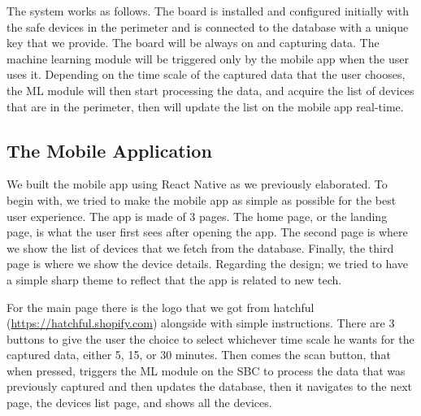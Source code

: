 \documentclass{article}
\begin{document}
The system works as follows. The board is installed and configured initially with the safe devices in the perimeter and is connected to the database with a unique key that we provide. The board will be always on and capturing data. The machine learning module will be triggered only by the mobile app when the user uses it. Depending on the time scale of the captured data that the user chooses, the ML module will then start processing the data, and acquire the list of devices that are in the perimeter, then will update the list on the mobile app real-time.\newline

\subsection{The Mobile Application}
We built the mobile app using React Native as we previously elaborated. To begin with, we tried to make the mobile app as simple as possible for the best user experience. The app is made of 3 pages. The home page, or the landing page, is what the user first sees after opening the app. The second page is where we show the list of devices that we fetch from the database. Finally, the third page is where we show the device details. Regarding the design; we tried to have a simple sharp theme to reflect that the app is related to new tech.\newline

For the main page there is the logo that we got from hatchful (\url{https://hatchful.shopify.com}) alongside with simple instructions. There are 3 buttons to give the user the choice to select whichever time scale he wants for the captured data, either 5, 15, or 30 minutes. Then comes the scan button, that when pressed, triggers the ML module on the SBC to process the data that was previously captured and then updates the database, then it navigates to the next page, the devices list page, and shows all the devices. \newline
\end{document}
